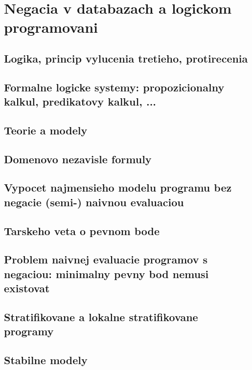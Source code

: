 \documentclass[12pt,a4paper]{article}
\begin{document}
\section{Negacia v databazach a logickom programovani}

\subsection{Logika, princip vylucenia tretieho, protirecenia}

\subsection{Formalne logicke systemy: propozicionalny kalkul, predikatovy kalkul, ...}

\subsection{Teorie a modely}

\subsection{Domenovo nezavisle formuly}

\subsection{Vypocet najmensieho modelu programu bez negacie (semi-) naivnou evaluaciou}

\subsection{Tarskeho veta o pevnom bode}

\subsection{Problem naivnej evaluacie programov s negaciou: minimalny pevny bod nemusi existovat}

\subsection{Stratifikovane a lokalne stratifikovane programy}

\subsection{Stabilne modely}
\end{document}
